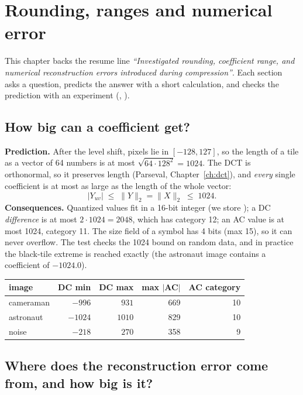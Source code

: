 \chapter{Rounding, ranges and numerical error}\label{ch:numerics}

This chapter backs the resume line \emph{``Investigated rounding, coefficient range, and numerical reconstruction errors introduced during compression''}. Each section asks a question, predicts the answer with a short calculation, and checks the prediction with an experiment (, ).

\section{How big can a coefficient get?}

\textbf{Prediction.} After the level shift, pixels lie in $[-128,127]$, so the length of a tile as a vector of 64 numbers is at most $\sqrt{64\cdot128^2}=1024$. The DCT is orthonormal, so it preserves length (Parseval, Chapter~\ref{ch:dct}), and \emph{every} single coefficient is at most as large as the length of the whole vector:
\[
|Y_{uv}|\;\le\;\|Y\|_2=\|X\|_2\;\le\;1024 .
\]
\textbf{Consequences.} Quantized values fit in a 16-bit integer (we store ); a DC \emph{difference} is at most $2\cdot1024=2048$, which has category 12; an AC value is at most 1024, category 11. The size field of a symbol has 4 bits (max 15), so it can never overflow. The test  checks the 1024 bound on random data, and in practice the black-tile extreme is reached exactly (the astronaut image contains a coefficient of $-1024.0$).

\begin{center}
\small
\begin{tabular}{@{}lrrrr@{}}
\toprule
image & DC min & DC max & max $|$AC$|$ & AC category\\ \midrule
cameraman & $-996$ & $931$ & 669 & 10\\
astronaut & $-1024$ & $1010$ & 829 & 10\\
noise & $-218$ & $270$ & 358 & 9\\ \bottomrule
\end{tabular}
\end{center}

\section{Where does the reconstruction error come from, and how big is it?}

